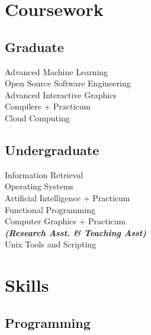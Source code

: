 \documentclass[letterpaper]{deedy-resume} %
\begin{document}
\begin{minipage}[t]{0.33\textwidth}
\sectionspace %


\section{Coursework}

\subsection{Graduate}

Advanced Machine Learning \\
Open Source Software Engineering \\
Advanced Interactive Graphics \\
Compilers + Practicum \\
Cloud Computing

\sectionspace %


\subsection{Undergraduate}

Information Retrieval \\
Operating Systems \\
Artificial Intelligence + Practicum \\
Functional Programming \\
Computer Graphics + Practicum \\
{\footnotesize \textit{\textbf{(Research Asst. \& Teaching Asst) }}} \\
Unix Tools and Scripting

\sectionspace %


\section{Skills}

\subsection{Programming}


\end{minipage}
\end{document}
